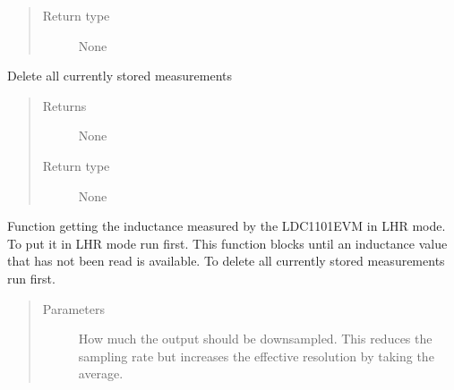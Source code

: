 \documentclass[letterpaper,10pt,english]{sphinxmanual}
\begin{document}
\begin{fulllineitems}
\begin{fulllineitems}
\begin{quote}
\begin{description}
\item[{Return type}] \leavevmode
\sphinxAtStartPar
None

\end{description}\end{quote}

\end{fulllineitems}


\begin{fulllineitems}
\label{\detokenize{index:ldc1101evm.ldc1101evm.flush}}
\sphinxAtStartPar
Delete all currently stored measurements
\begin{quote}\begin{description}
\item[{Returns}] \leavevmode
\sphinxAtStartPar
None

\item[{Return type}] \leavevmode
\sphinxAtStartPar
None

\end{description}\end{quote}

\end{fulllineitems}


\begin{fulllineitems}
\label{\detokenize{index:ldc1101evm.ldc1101evm.get_LHR_data}}
\sphinxAtStartPar
Function getting the inductance measured by the LDC1101EVM in LHR mode. To put it in LHR mode run {\hyperref[\detokenize{index:ldc1101evm.ldc1101evm.LHR_init}]{}} first. This function blocks until an inductance value that has not been read is available. To delete all currently stored measurements run {\hyperref[\detokenize{index:ldc1101evm.ldc1101evm.flush}]{}} first.
\begin{quote}\begin{description}
\item[{Parameters}] \leavevmode
\sphinxAtStartPar
{} \textendash{} How much the output should be downsampled. This reduces the sampling rate but increases the effective resolution by taking the average.


\end{description}
\end{quote}
\end{fulllineitems}
\end{fulllineitems}
\end{document}
